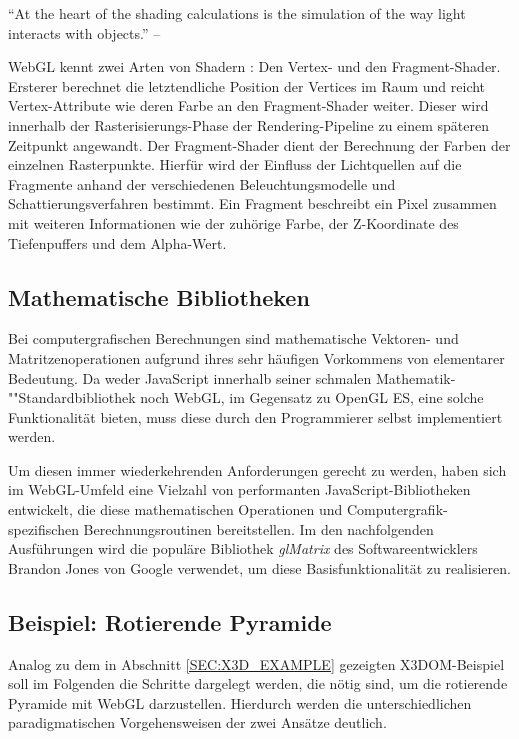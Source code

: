 \begin{itquote}
	\enquote{At the heart of the shading calculations is the simulation of the way light interacts with objects.} -- \textcite{Cook:1984:ST:964965.808602}
\end{itquote}

WebGL kennt zwei Arten von Shadern \autocite{Matsuda:2013}: Den Vertex- und den Fragment-Shader. Ersterer berechnet die letztendliche Position der Vertices im Raum und reicht Vertex-Attribute wie deren Farbe an den Fragment-Shader weiter. Dieser wird innerhalb der Rasterisierungs-Phase der Rendering-Pipeline zu einem späteren Zeitpunkt angewandt.
Der Fragment-Shader dient der Berechnung der Farben der einzelnen Rasterpunkte. Hierfür wird der Einfluss der Lichtquellen auf die Fragmente anhand der verschiedenen Beleuchtungsmodelle und Schattierungsverfahren bestimmt. Ein Fragment beschreibt ein Pixel zusammen mit weiteren Informationen wie der zuhörige Farbe, der Z-Koordinate des Tiefenpuffers und dem Alpha-Wert.

\subsection{Mathematische Bibliotheken}

Bei computergrafischen Berechnungen sind mathematische Vektoren- und Matritzenoperationen aufgrund ihres sehr häufigen Vorkommens von elementarer Bedeutung. Da weder JavaScript innerhalb seiner schmalen Mathematik-""Standardbibliothek noch WebGL, im Gegensatz zu OpenGL ES, eine solche Funktionalität bieten, muss diese durch den Programmierer selbst implementiert werden.

Um diesen immer wiederkehrenden Anforderungen gerecht zu werden, haben sich im WebGL-Umfeld eine Vielzahl von performanten JavaScript-Bibliotheken entwickelt, die diese mathematischen Operationen und Computergrafik-spezifischen Berechnungsroutinen bereitstellen. Im den nachfolgenden Ausführungen wird die populäre Bibliothek \emph{glMatrix} \autocite{SOFTWARE_GL_MATRIX} des Softwareentwicklers Brandon Jones von Google verwendet, um diese Basisfunktionalität zu realisieren.

\subsection{Beispiel: Rotierende Pyramide}
\label{SEC:WEBGL_EXAMPLE}

Analog zu dem in Abschnitt \ref{SEC:X3D_EXAMPLE} gezeigten X3DOM-Beispiel soll im Folgenden die Schritte dargelegt werden, die nötig sind, um die rotierende Pyramide mit WebGL darzustellen. Hierdurch werden die unterschiedlichen paradigmatischen Vorgehensweisen der zwei Ansätze deutlich.

